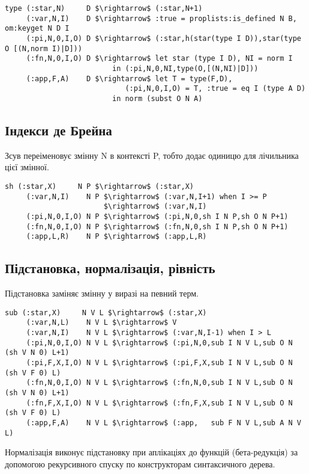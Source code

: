 \begin{lstlisting}[mathescape=true]
type (:star,N)     D $\rightarrow$ (:star,N+1)
     (:var,N,I)    D $\rightarrow$ :true = proplists:is_defined N B, om:keyget N D I
     (:pi,N,0,I,O) D $\rightarrow$ (:star,h(star(type I D)),star(type O [(N,norm I)|D]))
     (:fn,N,0,I,O) D $\rightarrow$ let star (type I D), NI = norm I
                         in (:pi,N,0,NI,type(O,[(N,NI)|D]))
     (:app,F,A)    D $\rightarrow$ let T = type(F,D),
                            (:pi,N,0,I,O) = T, :true = eq I (type A D)
                         in norm (subst O N A)
\end{lstlisting}

\subsection*{Індекси де Брейна}
Зсув переіменовує змінну N в контексті P, тобто додає одиницю для лічильника цієї змінної.

\begin{lstlisting}[mathescape=true]
  sh (:star,X)     N P $\rightarrow$ (:star,X)
     (:var,N,I)    N P $\rightarrow$ (:var,N,I+1) when I >= P
                       $\rightarrow$ (:var,N,I)
     (:pi,N,0,I,O) N P $\rightarrow$ (:pi,N,0,sh I N P,sh O N P+1)
     (:fn,N,0,I,O) N P $\rightarrow$ (:fn,N,0,sh I N P,sh O N P+1)
     (:app,L,R)    N P $\rightarrow$ (:app,L,R)
\end{lstlisting}

\newpage
\subsection*{Підстановка, нормалізація, рівність}
Підстановка заміняє змінну у виразі на певний терм.

\begin{lstlisting}[mathescape=true]
 sub (:star,X)     N V L $\rightarrow$ (:star,X)
     (:var,N,L)    N V L $\rightarrow$ V
     (:var,N,I)    N V L $\rightarrow$ (:var,N,I-1) when I > L
     (:pi,N,0,I,O) N V L $\rightarrow$ (:pi,N,0,sub I N V L,sub O N (sh V N 0) L+1)
     (:pi,F,X,I,O) N V L $\rightarrow$ (:pi,F,X,sub I N V L,sub O N (sh V F 0) L)
     (:fn,N,0,I,O) N V L $\rightarrow$ (:fn,N,0,sub I N V L,sub O N (sh V N 0) L+1)
     (:fn,F,X,I,O) N V L $\rightarrow$ (:fn,F,X,sub I N V L,sub O N (sh V F 0) L)
     (:app,F,A)    N V L $\rightarrow$ (:app,   sub F N V L,sub A N V L)
\end{lstlisting}

Нормалізація виконує підстановку при аплікаціях до функцій (бета-редукція)
за допомогою рекурсивного спуску по конструкторам синтаксичного дерева.

